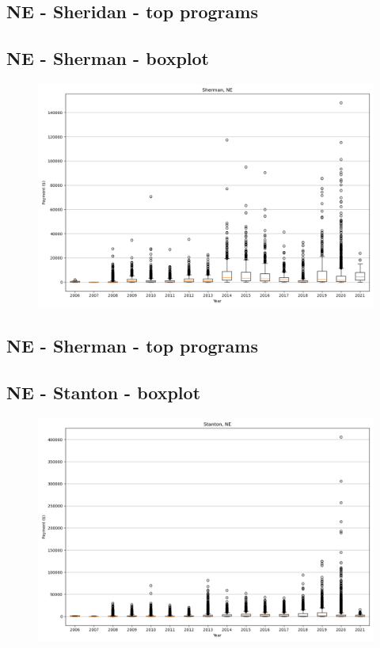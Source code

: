 \subsection*{NE - Sheridan - top programs}

\newpage
\subsection*{NE - Sherman - boxplot}
\begin{figure}[h]
\centering
\includegraphics[width=7in]{../output/boxplots/counties/Sherman-NE_boxplot.png}
\end{figure}


\subsection*{NE - Sherman - top programs}

\newpage
\subsection*{NE - Stanton - boxplot}
\begin{figure}[h]
\centering
\includegraphics[width=7in]{../output/boxplots/counties/Stanton-NE_boxplot.png}
\end{figure}


